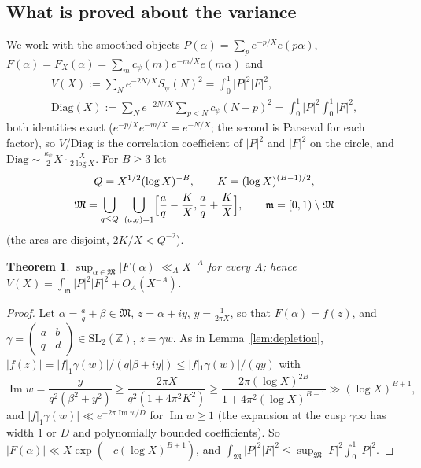 \documentclass[11pt]{amsart}
\newtheorem{theorem}{Theorem}[section]
\theoremstyle{remark}
\newcommand{\Z}{\mathbb Z}
\begin{document}
\subsection{What is proved about the variance}\label{subsec:reduction}
We work with the smoothed objects $P(\alpha)=\sum_pe^{-p/X}e(p\alpha)$, $F(\alpha)=F_X(\alpha)=\sum_mc_\psi(m)e^{-m/X}e(m\alpha)$ and
\begin{gather*}
V(X):=\sum_Ne^{-2N/X}S_\psi(N)^2=\int_0^1|P|^2|F|^2,\\
\mathrm{Diag}(X):=\sum_Ne^{-2N/X}\sum_{p<N}c_\psi(N-p)^2=\int_0^1|P|^2\int_0^1|F|^2,
\end{gather*}
both identities exact ($e^{-p/X}e^{-m/X}=e^{-N/X}$; the second is Parseval for each factor), so $V/\mathrm{Diag}$ is the correlation coefficient of $|P|^2$ and $|F|^2$ on the circle, and $\mathrm{Diag}\sim\frac{\kappa_\psi}2X\cdot\frac X{2\log X}$. For $B\ge3$ let
\begin{gather*}
Q=X^{1/2}(\log X)^{-B},\qquad K=(\log X)^{(B-1)/2},\\
\mathfrak M=\bigcup_{q\le Q}\ \bigcup_{(a,q)=1}\Bigl[\frac aq-\frac KX,\frac aq+\frac KX\Bigr],\qquad \mathfrak m=[0,1)\setminus\mathfrak M
\end{gather*}
(the arcs are disjoint, $2K/X<Q^{-2}$).

\begin{theorem}\label{thm:reduction}
$\sup_{\alpha\in\mathfrak M}|F(\alpha)|\ll_{A}X^{-A}$ for every $A$; hence $V(X)=\int_{\mathfrak m}|P|^2|F|^2+O_A(X^{-A})$.
\end{theorem}
\begin{proof}
Let $\alpha=\frac aq+\beta\in\mathfrak M$, $z=\alpha+iy$, $y=\frac1{2\pi X}$, so that $F(\alpha)=f(z)$, and $\gamma=\left(\begin{smallmatrix}a&b\\q&d\end{smallmatrix}\right)\in\mathrm{SL}_2(\Z)$, $z=\gamma w$. As in Lemma~\ref{lem:depletion}, $|f(z)|=|f|_1\gamma(w)|/(q|\beta+iy|)\le|f|_1\gamma(w)|/(qy)$ with
\[
\operatorname{Im}w=\frac{y}{q^2(\beta^2+y^2)}\ge\frac{2\pi X}{q^2(1+4\pi^2K^2)}\ge\frac{2\pi(\log X)^{2B}}{1+4\pi^2(\log X)^{B-1}}\gg(\log X)^{B+1},
\]
and $|f|_1\gamma(w)|\ll e^{-2\pi\operatorname{Im}w/D}$ for $\operatorname{Im}w\ge1$ (the expansion at the cusp $\gamma\infty$ has width $1$ or $D$ and polynomially bounded coefficients). So $|F(\alpha)|\ll X\exp(-c(\log X)^{B+1})$, and $\int_{\mathfrak M}|P|^2|F|^2\le\sup_{\mathfrak M}|F|^2\int_0^1|P|^2$.
\end{proof}
\end{document}
